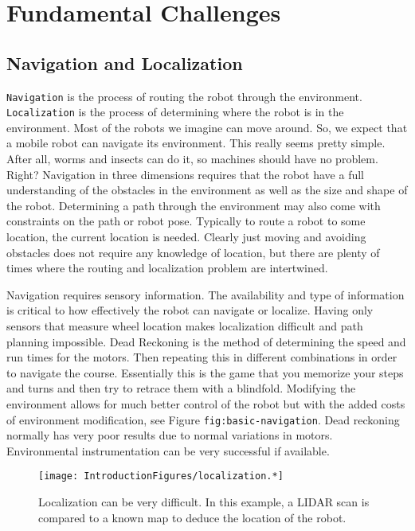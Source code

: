 \hypertarget{fundamental-challenges}{%
\section{Fundamental Challenges}\label{fundamental-challenges}}

\hypertarget{navigation-and-localization}{%
\subsection{Navigation and
Localization}\label{navigation-and-localization}}

\texttt{Navigation} is the process of routing the robot through the
environment. \texttt{Localization} is the process of determining where
the robot is in the environment. Most of the robots we imagine can move
around. So, we expect that a mobile robot can navigate its environment.
This really seems pretty simple. After all, worms and insects can do it,
so machines should have no problem. Right? Navigation in three
dimensions requires that the robot have a full understanding of the
obstacles in the environment as well as the size and shape of the robot.
Determining a path through the environment may also come with
constraints on the path or robot pose. Typically to route a robot to
some location, the current location is needed. Clearly just moving and
avoiding obstacles does not require any knowledge of location, but there
are plenty of times where the routing and localization problem are
intertwined.

Navigation requires sensory information. The availability and type of
information is critical to how effectively the robot can navigate or
localize. Having only sensors that measure wheel location makes
localization difficult and path planning impossible. Dead Reckoning is
the method of determining the speed and run times for the motors. Then
repeating this in different combinations in order to navigate the
course. Essentially this is the game that you memorize your steps and
turns and then try to retrace them with a blindfold. Modifying the
environment allows for much better control of the robot but with the
added costs of environment modification, see Figure
\texttt{fig:basic-navigation}. Dead reckoning normally has very poor
results due to normal variations in motors. Environmental
instrumentation can be very successful if available.

\begin{figure}
\centering
\texttt{[image: IntroductionFigures/localization.*]}
\caption{Localization can be very difficult. In this example, a LIDAR
scan is compared to a known map to deduce the location of the robot.}
\end{figure}

